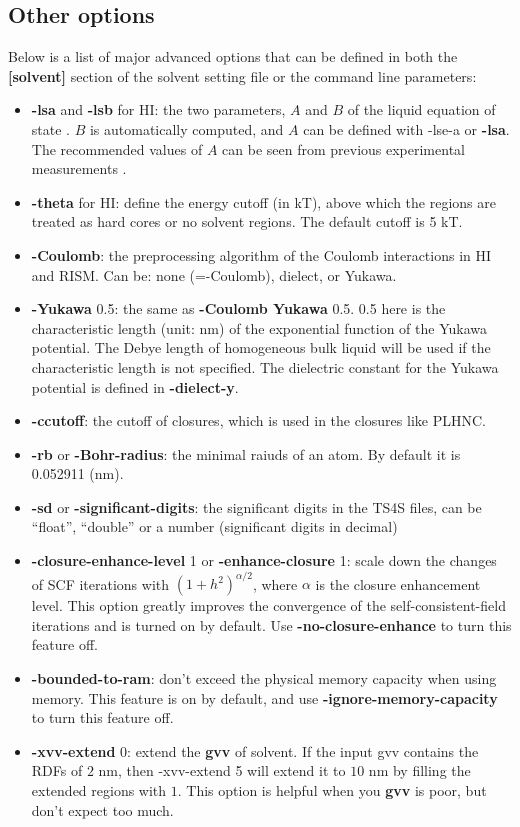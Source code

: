 \documentclass[aip,amsmath,amssymb,reprint,onecolumn]{revtex4-1}
\begin{document}
\subsection{Other options}\label{sec:param.options}

Below is a list of major advanced options that can be defined in both the {\bf[solvent]} section of the solvent setting file or the command line parameters:

\begin{itemize}
    \item {\bf -lsa} and {\bf -lsb} for HI: the two parameters, $A$ and $B$ of the liquid equation of state \cite{Cao_Xuhu_JCP_2015, Cao_Xuhu_MP_2018, Cao_Huang_AdTS_2019}. $B$ is automatically computed, and $A$ can be defined with {\rm -lse-a} or {\bf -lsa}. The recommended values of $A$ can be seen from previous experimental measurements \cite{DYMOND_IJT_1988}.
    \item {\bf -theta} for HI: define the energy cutoff (in kT), above which the regions are treated as hard cores or no solvent regions. The default cutoff is 5 kT.
    \item {\bf -Coulomb}: the preprocessing algorithm of the Coulomb interactions in HI and RISM. Can be: none (=-Coulomb), dielect, or Yukawa.
    \item {\bf -Yukawa} 0.5: the same as {\bf -Coulomb Yukawa} 0.5. 0.5 here is the characteristic length (unit: nm) of the exponential function of the Yukawa potential. The Debye length of homogeneous bulk liquid will be used if the characteristic length is not specified. The dielectric constant for the Yukawa potential is defined in {\bf -dielect-y}.
    \item {\bf -ccutoff}: the cutoff of closures, which is used in the closures like PLHNC.
    \item {\bf -rb} or {\bf -Bohr-radius}: the minimal raiuds of an atom. By default it is 0.052911 (nm).
    \item {\bf -sd} or {\bf -significant-digits}: the significant digits in the TS4S files, can be ``float'', ``double'' or a number (significant digits in decimal)
    \item {\bf -closure-enhance-level} 1 or {\bf -enhance-closure} 1: scale down the changes of SCF iterations with $(1+h^2)^{\alpha/2}$, where $\alpha$ is the closure enhancement level. This option greatly improves the convergence of the self-consistent-field iterations and is turned on by default. Use {\bf -no-closure-enhance} to turn this feature off.
    \item {\bf -bounded-to-ram}: don't exceed the physical memory capacity when using memory. This feature is on by default, and use {\bf -ignore-memory-capacity} to turn this feature off.
    \item {\bf -xvv-extend} 0: extend the {\bf gvv} of solvent. If the input gvv contains the RDFs of $2$ nm, then -xvv-extend 5 will extend it to $10$ nm by filling the extended regions with $1$. This option is helpful when you {\bf gvv} is poor, but don't expect too much.
\end{itemize}




%
\end{document}
